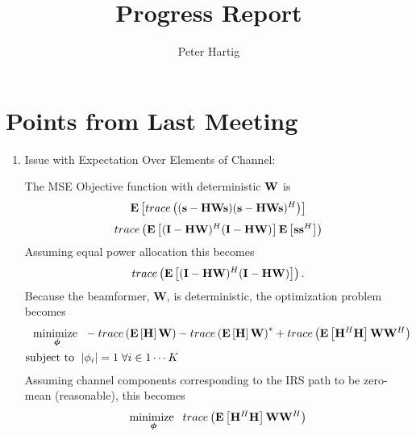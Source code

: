 \documentclass[12pt,a4paper]{report}
\title{Progress Report}
\author{Peter Hartig}
\begin{document}
\maketitle
\tableofcontents
\section{Points from Last Meeting}
\begin{enumerate}
In the first iteration of CSI collection, 1 pilot is 
\item{Issue with Expectation Over Elements of Channel:} \par
	The MSE Objective function with deterministic $\mathbf{W} $ is 
	\begin{equation}
	\mathop{\bf E{}}\left[\mathop{trace}\left((\mathbf{s} - \mathbf{H} \mathbf{W} \mathbf{s} )  (\mathbf{s} - \mathbf{H} \mathbf{W} \mathbf{s} ) ^H  \right)\right]
	\end{equation}
		\begin{equation}
	\mathop{trace}\left(\mathop{\bf E{}}\left[ (\mathbf{I} - \mathbf{H} \mathbf{W}  )^H  (\mathbf{I} - \mathbf{H} \mathbf{W}  ) \right] \mathop{\bf E{}}\left[ \mathbf{s}\mathbf{s}^H\right]\right)
	\end{equation}
	Assuming equal power allocation this becomes
	\begin{equation}
	\mathop{trace}\left(\mathop{\bf E{}}\left[ (\mathbf{I} - \mathbf{H} \mathbf{W}  )^H  (\mathbf{I} - \mathbf{H} \mathbf{W}  )  \right]\right).
	\end{equation}
	Because the beamformer, $\mathbf{W}$, is deterministic, the optimization problem becomes
		\begin{subequations}
	\label{mse_problem_total}
	\begin{align}
	   	    \underset{\boldsymbol{\phi}}{\text{minimize }}
	    & \; - \mathop{trace} \left( \mathop{\bf E{}}\left[\mathbf{H} \right] \mathbf{W} \right) - \mathop{trace} \left( \mathop{\bf E{}}\left[\mathbf{H} \right]  \mathbf{W}\right)^* +
	    \mathop{trace}\left(\mathop{\bf E{}}\left[\mathbf{H}^H \mathbf{H} \right] \mathbf{W} \mathbf{W}^H \right)
	     \\
	    \text{subject to  } \; &
	    | \phi_i | = 1   \; \forall i \in {1 \cdots	 K}
	\end{align}
	\end{subequations}	
	Assuming channel components corresponding to the IRS path to be zero-mean (reasonable), this becomes 
		\begin{subequations}
	\label{mse_problem_total}
	\begin{align}
	   	    \underset{\boldsymbol{\phi}}{\text{minimize }}
	    & \; \trace\left(\Expect\left[\mathbf{H}^H \mathbf{H} \right] \mathbf{W} \mathbf{W}^H \right)
	     \\

\end{align}
\end{subequations}
\end{enumerate}
\end{document}
